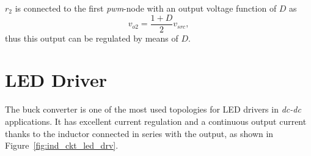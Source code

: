 $r_2$ is connected to the first \emph{pwm}-node with an output voltage function of $D$ as
\begin{equation}
v_{o2} = \frac{1+D}{2} v_{src},
\end{equation}
thus this output can be regulated by means of $D$.

%


\section{LED Driver}

The buck converter is one of the most used topologies for LED drivers in \emph{dc-dc} applications. It has excellent current regulation and a continuous output current thanks to the inductor connected in series with the output, as shown in Figure~\ref{fig:ind_ckt_led_drv}.

